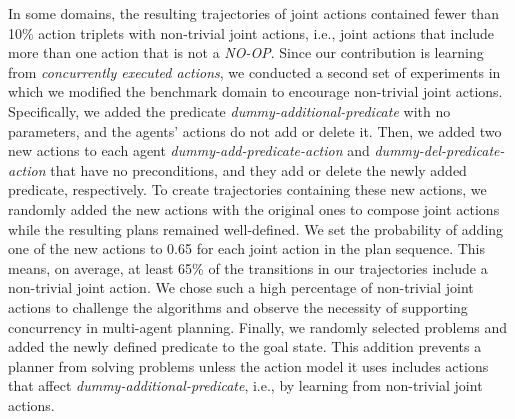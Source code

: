 \documentclass[letterpaper]{article} %
\theoremstyle{definition}
\theoremstyle{remark}
\newcommand{\noop}{\textit{NO-OP}\xspace}
\newcommand{\roni}[1]{{\textcolor{red}{[Roni: #1]}}}
\begin{document}
In some domains, the resulting trajectories of joint actions contained fewer than 10\% action triplets with non-trivial joint actions, i.e., joint actions that include more than one action that is not a \noop. 
Since our contribution is learning from \emph{concurrently executed actions}, we conducted a second set of experiments in which we modified the benchmark domain to encourage non-trivial joint actions. Specifically,  
we added the predicate \textit{dummy-additional-predicate} with no parameters, and the agents' actions do not add or delete it.
Then, we added two new actions to each agent \textit{dummy-add-predicate-action} and \textit{dummy-del-predicate-action} that have no preconditions, and they add or delete the newly added predicate, respectively. 
To create trajectories containing these new actions, we randomly added the new actions with the original ones to compose joint actions while the resulting plans remained well-defined. 
We set the probability of adding one of the new actions to 0.65 for each joint action in the plan sequence.  
This means, on average, at least 65\% of the transitions in our trajectories include a non-trivial joint action. %
We chose such a high percentage of non-trivial joint actions to challenge the algorithms and observe the necessity of supporting concurrency in multi-agent planning. %
Finally, we randomly selected problems and added the newly defined predicate to the goal state. 
This addition prevents a planner from solving problems unless the action model it uses includes actions that affect \textit{dummy-additional-predicate}, i.e., by learning from non-trivial joint actions. 
\end{document}
